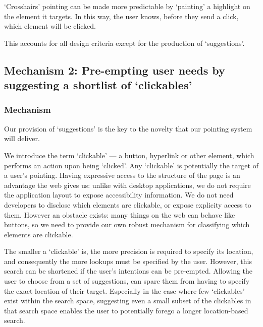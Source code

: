 \documentclass[11pt,openright,a4paper]{report}
\begin{document}
`Crosshairs' pointing can be made more predictable by `painting' a highlight on the element it targets. In this way, the user knows, before they send a click, which element will be clicked.

This accounts for all design criteria except for the production of `suggestions'.
\subsection{Mechanism 2: Pre-empting user needs by suggesting a shortlist of `clickables'}
\subsubsection{Mechanism}
Our provision of `suggestions' is the key to the novelty that our pointing system will deliver.

\label{sec:clickablesExplained}
We introduce the term `clickable' --- a button, hyperlink or other element, which performs an action upon being `clicked'. Any `clickable' is potentially the target of a user's pointing. Having expressive access to the structure of the page is an advantage the web gives us: unlike with desktop applications, we do not require the application layout to expose accessibility information. We do not need developers to disclose which elements are clickable, or expose explicity access to them. However an obstacle exists: many things on the web can behave like buttons, so we need to provide our own robust mechanism for classifying which elements are clickable.

The smaller a `clickable' is, the more precision is required to specify its location, and consequently the more lookups must be specified by the user. However, this search can be shortened if the user's intentions can be pre-empted. Allowing the user to choose from a set of suggestions, can spare them from having to specify the exact location of their target. Especially in the case where few `clickables' exist within the search space, suggesting even a small subset of the clickables in that search space enables the user to potentially forego a longer location-based search.
\end{document}
